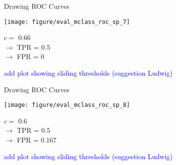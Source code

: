 \documentclass[11pt,compress,t,notes=noshow, xcolor=table]{beamer}
\newenvironment{knitrout}{}{} %
\begin{document}

\begin{vbframe}{Drawing ROC Curves}

\begin{knitrout}\scriptsize
{}\color{fgcolor}

{
\texttt{[image: figure/eval\_mclass\_roc\_sp\_7]}
}

\end{knitrout}

\vfill

\begin{minipage}[b]{0.3\textwidth}
  $c =$ 0.66\\ 
  $\rightarrow$ TPR = 0.5 \\
  $\rightarrow$ FPR = 0
\end{minipage}%
\begin{minipage}[b]{0.7\textwidth}
  \textcolor{blue}{add plot showing sliding thresholds (suggestion Ludwig)}
\end{minipage}

\end{vbframe}


\begin{vbframe}{Drawing ROC Curves}

\begin{knitrout}\scriptsize
{}\color{fgcolor}

{
\texttt{[image: figure/eval\_mclass\_roc\_sp\_8]}
}

\end{knitrout}

\vfill

\begin{minipage}[b]{0.3\textwidth}
  $c =$ 0.6\\ 
  $\rightarrow$ TPR = 0.5 \\
  $\rightarrow$ FPR = 0.167
\end{minipage}%
\begin{minipage}[b]{0.7\textwidth}
  \textcolor{blue}{add plot showing sliding thresholds (suggestion Ludwig)}
\end{minipage}

\end{vbframe}
\end{document}
